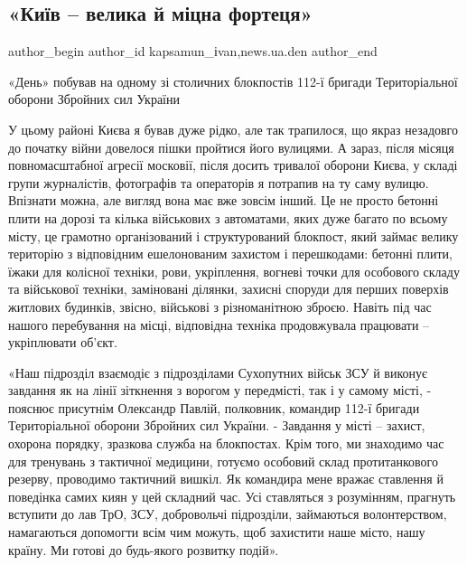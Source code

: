  
 
 
 
 
 
\subsection{«Київ – велика й міцна фортеця»}
\label{sec:29_03_2022.stz.news.ua.den.1.kiev_fortecja}
 
\ifcmt
 author_begin
   author_id kapsamun_іvan,news.ua.den
 author_end
\fi

\begin{zznagolos}
«День» побував на одному зі столичних блокпостів 112-ї бригади Територіальної
оборони Збройних сил України	
\end{zznagolos}

У цьому районі Києва я бував дуже рідко, але так трапилося, що якраз незадовго
до початку війни довелося пішки пройтися його вулицями. А зараз, після місяця
повномасштабної агресії московії, після досить тривалої оборони Києва, у складі
групи журналістів, фотографів та операторів я потрапив на ту саму вулицю.
Впізнати можна, але вигляд вона має вже зовсім інший. Це не просто бетонні
плити на дорозі та кілька військових з автоматами, яких дуже багато по всьому
місту, це грамотно організований і структурований блокпост, який займає велику
територію з відповідним ешелонованим захистом і перешкодами: бетонні плити,
їжаки для колісної техніки, рови, укріплення, вогневі точки для особового
складу та військової техніки, заміновані ділянки, захисні споруди для перших
поверхів житлових будинків, звісно, військові з різноманітною зброєю. Навіть
під час нашого перебування на місці, відповідна техніка продовжувала працювати
– укріплювати об'єкт.


«Наш підрозділ взаємодіє з підрозділами Сухопутних військ ЗСУ й виконує
завдання як на лінії зіткнення з ворогом у передмісті, так і у самому місті, -
пояснює присутнім Олександр Павлій, полковник, командир 112-ї бригади
Територіальної оборони Збройних сил України. - Завдання у місті – захист,
охорона порядку, зразкова служба на блокпостах. Крім того, ми знаходимо час для
тренувань з тактичної медицини, готуємо особовий склад протитанкового резерву,
проводимо тактичний вишкіл. Як командира мене вражає ставлення й поведінка
самих киян у цей складний час. Усі ставляться з розумінням, прагнуть вступити
до лав ТрО, ЗСУ, добровольчі підрозділи, займаються волонтерством, намагаються
допомогти всім чим можуть, щоб захистити наше місто, нашу країну. Ми готові до
будь-якого розвитку подій».

